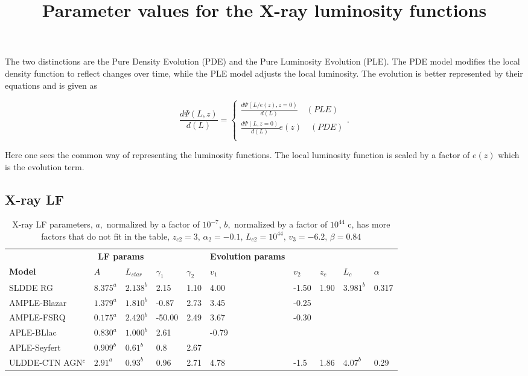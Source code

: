  The two distinctions are the Pure Density Evolution (PDE) and the Pure Luminosity Evolution (PLE). 
 The PDE model modifies the local density function to reflect changes over time, 
 while the PLE model adjusts the local luminosity. The evolution is better represented by their equations and is given as 

 \begin{equation}\frac{d\Psi(L,z)}{d(L)} = 
    \begin{cases}
        \frac{d\Psi(L/e(z),z=0)}{d(L)} \quad (PLE)\\
        \frac{d\Psi(L,z=0)}{d(L)}e(z) \quad (PDE)\\
    \end{cases}
    .
\end{equation}

Here one sees the common way of representing the luminosity functions. The local luminosity function is scaled by a factor of $e(z)$ which is the evolution term.
\subsection{X-ray LF}

\begin{table}
    \centering
    \title{Parameter values for the X-ray luminosity functions}
    \begin{tabularx}{\textwidth}{|l|XXXX|XXXXX|}
        \hline

        & \multicolumn{2}{c}{\textbf{LF params}} &&&  \textbf{Evolution params} &&&&\\

        \textbf{Model} & $A$ & $L_{star}$ & $\gamma _1$ &  $\gamma _2$  & $v_1$ & $v_2$ & $z_c$ & $L_c$ & $ \alpha$\\
        \hline
        SLDDE RG & $8.375^a$ & $2.138^b$ & 2.15 & 1.10 & 4.00 & -1.50 & 1.90 & $3.981^b$ & 0.317  \\

        AMPLE-Blazar & $1.379^a$ & $1.810^b$ & -0.87 & 2.73 & 3.45 & -0.25 & & &  \\

        AMPLE-FSRQ & $0.175^a$ & $2.420^b$ & -50.00 & 2.49 & 3.67 & -0.30 & & &  \\

        APLE-BLlac & $0.830^a$& $1.000^b$ & 2.61 & &-0.79& & & &  \\
        APLE-Seyfert & $0.909^b$ & $0.61^b$ & 0.8 & 2.67& & & & &  \\
        ULDDE-CTN AGN$^c$ & $2.91^a$ & $0.93^b$ & 0.96 & 2.71& 4.78 &-1.5 &1.86 &$4.07^b$ &0.29  \\
        \hline
    \end{tabularx}
    \caption{X-ray LF parameters, $a,$ normalized by a factor of $10^{-7}$, $b,$ normalized by a factor of $10^{44}$
    c, has more factors that do not fit in the table, $z_{c2} = 3$, $\alpha_2 =-0.1$, $L_{c2} = 10^{44}$, $v_3 = -6.2 $, $\beta=0.84$ }
    \label{tab:xray_lf}
\end{table}

